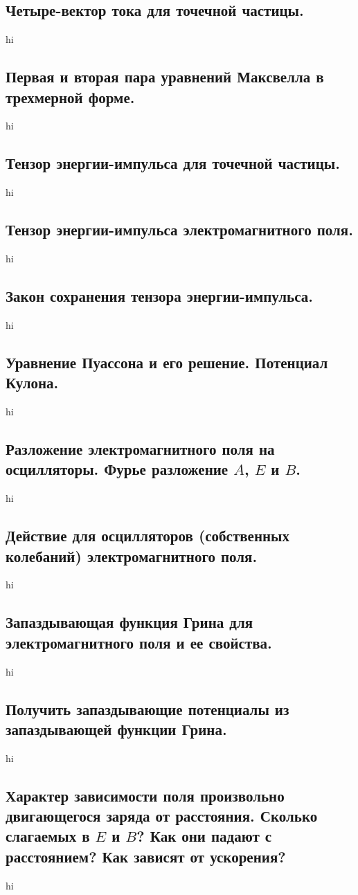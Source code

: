 \documentclass[a4paper,12pt]{article}
\begin{document}
\subsection{Четыре-вектор тока для точечной частицы.}
hi
\subsection{Первая и вторая пара уравнений Максвелла в трехмерной форме.}
hi
\subsection{Тензор энергии-импульса для точечной частицы.}
hi
\subsection{Тензор энергии-импульса электромагнитного поля.}
hi
\subsection{Закон сохранения тензора энергии-импульса.}
hi
\subsection{Уравнение Пуассона и его решение. Потенциал Кулона.}
hi
\subsection{Разложение электромагнитного поля на осцилляторы. Фурье разложение 
$A$, $E$ и $B$.}
hi
\subsection{Действие для осцилляторов (собственных колебаний)
электромагнитного поля.}
hi
\subsection{Запаздывающая функция Грина для электромагнитного поля и ее
свойства.}
hi
\subsection{Получить запаздывающие потенциалы из запаздывающей функции Грина.}
hi
\subsection{Характер зависимости поля произвольно двигающегося заряда от
расстояния. Сколько слагаемых в $E$ и $B$? Как они падают с расстоянием?
Как зависят от ускорения?}
hi
\end{document}
